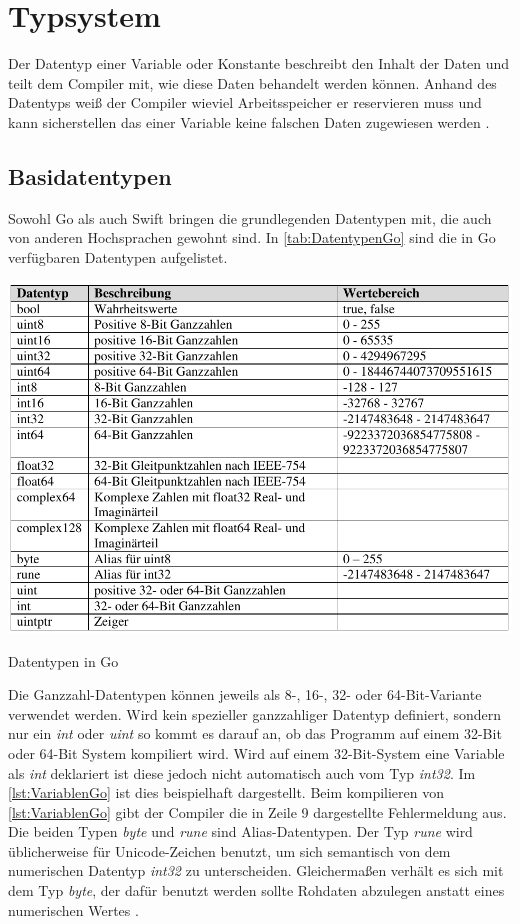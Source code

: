 \chapter{Typsystem}
\label{ch:Typsystem}
Der Datentyp einer Variable oder Konstante beschreibt den Inhalt der Daten und teilt dem Compiler mit, wie diese Daten behandelt werden können. 
Anhand des Datentyps weiß der Compiler wieviel Arbeitsspeicher er reservieren muss und kann sicherstellen das einer Variable keine falschen Daten zugewiesen werden \cite[S.62]{Mathias.2016}.

\section{Basidatentypen}
Sowohl Go als auch Swift bringen die grundlegenden Datentypen mit, die auch von anderen Hochsprachen gewohnt sind.
In \autoref{tab:DatentypenGo} sind die in Go verfügbaren Datentypen aufgelistet.

\begin{table}[H]
    \centering
    \includegraphics[width=\textwidth]{Tabellen/Datentypen_Go.pdf}
    \caption{Datentypen in Go}
    \label{tab:DatentypenGo}
\end{table}

Die Ganzzahl-Datentypen können jeweils als 8-, 16-, 32- oder 64-Bit-Variante verwendet werden. 
Wird kein spezieller ganzzahliger Datentyp definiert, sondern nur ein \emph{int} oder \emph{uint} so kommt es darauf an, ob das Programm auf einem 32-Bit oder 64-Bit System kompiliert wird.
Wird auf einem 32-Bit-System eine Variable als \emph{int} deklariert ist diese jedoch nicht automatisch auch vom Typ \emph{int32}.
Im \autoref{lst:VariablenGo} ist dies beispielhaft dargestellt. 
Beim kompilieren von \autoref{lst:VariablenGo} gibt der Compiler die in Zeile 9 dargestellte Fehlermeldung aus. 
Die beiden Typen \emph{byte} und \emph{rune} sind Alias-Datentypen.
Der Typ \emph{rune} wird üblicherweise für Unicode-Zeichen benutzt, um sich semantisch von dem numerischen Datentyp \emph{int32} zu unterscheiden. 
Gleichermaßen verhält es sich mit dem Typ \emph{byte}, der dafür benutzt werden sollte Rohdaten abzulegen anstatt eines numerischen Wertes \cite[S.98]{Kennedy.2016}.

